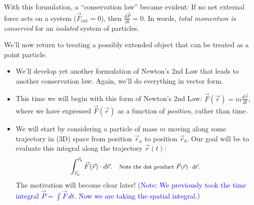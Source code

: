 \documentclass[11pt, letterpaper, openany]{book}
\begin{document}
With this formulation, a ``conservation law'' became evident: If no net external force acts on a system ($\vec{F}_{\text{ext}} = 0$), then $\frac{d\vec{P}}{dt} = 0$. In words, \textit{total momentum is conserved} for an \textit{isolated} system of particles.

We'll now return to treating a possibly extended object that can be treated as a point particle.
\begin{itemize}
    \item We'll develop yet another formulation of Newton's 2nd Law that leads to another conservation law. Again, we'll do everything in vector form.
    \item This time we will begin with this form of Newton's 2nd Law: $\vec{F}(\vec{r}) = m\frac{d\vec{v}}{dt}$, where we have expressed $\vec{F}(\vec{r})$ as a function of \textit{position}, rather than time.
    \item We will start by considering a particle of mass $m$ moving along some trajectory in (3D) space from position $\vec{r}_a$ to position $\vec{r}_b$. Our goal will be to evaluate this integral along the trajectory $\vec{r}(t)$:
    \[ \int_{\vec{r}_a}^{\vec{r}_b} \vec{F}(\vec{r}) \cdot d\vec{r}. \quad \text{\footnotesize{Note the dot product $\vec{F}(\vec{r}) \cdot d\vec{r}$.}} \]
    The motivation will become clear later! (\textcolor{blue}{Note: We previously took the time integral $\vec{P} = \int \vec{F}\,dt$. Now we are taking the spatial integral.})
\end{itemize}
\end{document}
